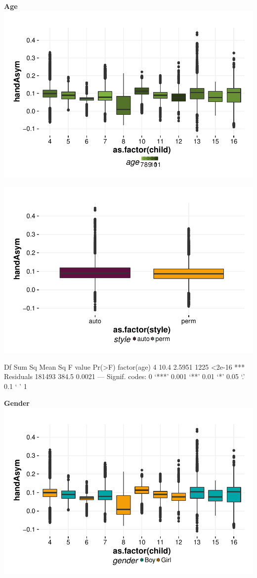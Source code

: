 \documentclass{article}
\begin{document}
\textbf{Age}
\includegraphics{features-plot_handAsymmetry_child_age_quiz}

\includegraphics{features-plot_handAsymmetry_style_quiz}

\begin{Schunk}
\begin{Soutput}
                Df Sum Sq Mean Sq F value Pr(>F)    
factor(age)      4   10.4  2.5951    1225 <2e-16 ***
Residuals   181493  384.5  0.0021                   
---
Signif. codes:  0 ‘***’ 0.001 ‘**’ 0.01 ‘*’ 0.05 ‘.’ 0.1 ‘ ’ 1
\end{Soutput}
\end{Schunk}

\textbf{Gender}
\includegraphics{features-plot_handAsymmetry_child_gender_quiz}
\end{document}
